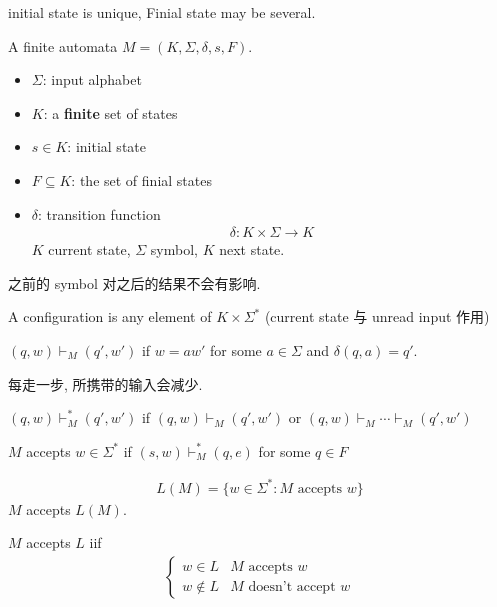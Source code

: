 initial state is unique, Finial state may be several. 

\begin{definition}
    A finite automata $M=(K, \Sigma, \delta, s, F)$. 
    \begin{itemize}
        \item $\Sigma$: input alphabet
        \item $K$: a \textbf{finite} set of states
        \item $s\in K$: initial state
        \item $F\subseteq K$: the set of finial states
        \item $\delta$: transition function
        \begin{align*}
            \delta: K \times \Sigma \rightarrow K
        \end{align*}
        $K$ current state, $\Sigma$ symbol, $K$ next state. 
    \end{itemize}
\end{definition}


之前的 symbol 对之后的结果不会有影响.

\begin{definition}[configuration]
    A configuration is any element of $K\times \Sigma^*$
    (current state 与 unread input 作用)
\end{definition}

\begin{definition}
    $(q,w)\vdash_M (q', w')$ if $w=aw'$ for some $a\in \Sigma$ and $\delta(q, a)=q'$. 
\end{definition}
每走一步, 所携带的输入会减少. 

\begin{definition}[yields]
    $(q,w)\vdash_M^* (q', w')$ if $(q,w)\vdash_M(q', w')$ or $(q,w)\vdash_M\cdots \vdash_M(q', w')$
\end{definition}


\begin{definition}
    $M$ accepts $w\in \Sigma^*$ if $(s,w)\vdash_M^*(q,e)$ for some $q\in F$
\end{definition}

\begin{definition}
    \begin{align*}
        L(M)=\{ w\in \Sigma^*: M\text{ accepts }w \}
    \end{align*}
    $M$ accepts $L(M)$. 
\end{definition}

$M$ accepts $L$ iif
\begin{align*}
    \left\{ \begin{array}{ll}
        w\in L & M\text{ accepts }w\\
        w\notin L & M\text{ doesn't accept }w
    \end{array} \right.
\end{align*}

